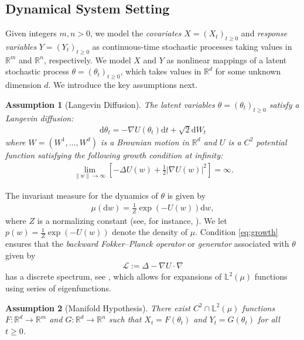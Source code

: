 \documentclass[11pt]{article}
\theoremstyle{plain}
\newtheorem{assumption}{Assumption}
\theoremstyle{definition}
\theoremstyle{remark}
\numberwithin{equation}{section}
\newcommand{\R}{\mathbb{R}}
\renewcommand{\L}{\mathscr{L}}
\renewcommand{\d}{\mathrm{d}}
\newcommand{\lb}{\left}
\newcommand{\rb}{\right}
\newcommand{\bL}{\mathbb{L}}
\begin{document}
\subsection{Dynamical System Setting}\label{sec:assumps}

Given integers $m,n>0$, we model the \emph{covariates} $X=(X_t)_{t\ge0}$ and \emph{response variables} $Y=(Y_t)_{t\ge0}$ as continuous-time stochastic processes taking values in $\R^m$ and $\R^n$, respectively. We model $X$ and $Y$ as nonlinear mappings of a latent stochastic process $\theta=(\theta_t)_{t\ge 0}$, which takes values in $\R^d$ for some unknown dimension $d$. We introduce the key assumptions next.

\begin{assumption}[Langevin Diffusion]\label{ass1}
The latent variables $\theta=(\theta_t)_{t\ge 0}$ satisfy a Langevin diffusion:
\begin{align}\label{eq:thetaSDE}
\d \theta_t = -\nabla U(\theta_t)\d t+\sqrt{2}\d W_t
\end{align}
where $W=(W^1,\dots, W^d)$ is a Brownian motion in $\R^d$ and $U$ is a $C^2$ potential function satisfying the following growth condition at infinity:
\begin{align}\label{eq:growth}
\lim_{\|w\| \to\infty} \lb[-\Delta U(w)+\frac{1}{2}|\nabla U(w)|^2\rb]=\infty.
\end{align}
\end{assumption}
The invariant measure for the dynamics of $\theta$ is given by
\begin{align*}
\mu(\d w)=\frac{1}{Z}\exp(-U(w))\d w,
\end{align*}
where $Z$ is a normalizing constant (see, for instance, \citet[Section 1.15.7]{bakry_analysis_2014}). We let $p(w)=\frac{1}{Z}\exp(-U(w))$ denote the density of $\mu$.
Condition \eqref{eq:growth} ensures that the \emph{backward Fokker--Planck operator} or \emph{generator} associated with $\theta$ given by
\begin{align*}
\L :=\Delta -\nabla U\cdot \nabla
\end{align*}
has a discrete spectrum, see \citet[Corollary 4.10.9]{bakry_analysis_2014}, which allows for expansions of $\bL^2(\mu)$ functions using series of eigenfunctions.

\begin{assumption}[Manifold Hypothesis]\label{ass2}
There exist $C^2\cap \bL^2(\mu)$ functions $F:\R^d\to \R^m$ and $G:\R^d\to \R^n$ such that ${X_t=F(\theta_t)}$ and  ${Y_t=G(\theta_t)}$ for all $t\ge 0$. 
\end{assumption}
\end{document}

